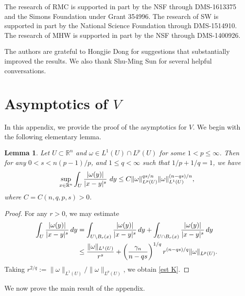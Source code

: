 \documentclass[11pt,reqno]{amsart}
\newcommand{\R}{\mathbb{R}}
\theoremstyle{plain}
\newtheorem{lemma}[theorem]{Lemma}
\theoremstyle{remark}
\numberwithin{equation}{section}
\begin{document}
The research of RMC is supported in part by the NSF through DMS-1613375 and the Simons Foundation under Grant 354996.  The research of SW is supported in part by the National Science Foundation through DMS-1514910.  The research of MHW is supported in part by the NSF through DMS-1400926.


The authors are grateful to Hongjie Dong for suggestions that substantially improved the results. We also thank Shu-Ming Sun for several helpful conversations.

\appendix
\section{Asymptotics of \texorpdfstring{$V$}{V}} \label{V appendix}

In this appendix, we provide the proof of the asymptotics for $V$.  We begin with the following elementary lemma.
\begin{lemma}\label{lem_velocity}
Let $U\subset \R^n$ and $\omega \in L^1(U) \cap L^p(U)$ for some $1< p \leq \infty$. Then for any $0<s < {n(p-1) / p}$, and $1 \leq q < \infty$ such that $1/p + 1/q = 1$, we have
\begin{equation}
  \label{est K}
  \sup_{x \in \mathbb{R}^n} \int_U {|\omega(y)| \over |x - y|^s} \ dy \leq C \|\omega\|_{L^p(U)}^{qs/n} \|\omega\|_{L^1(U)}^{(n-qs)/n},
\end{equation}
where $C = C(n,q,p,s) > 0$.
\end{lemma}
\begin{proof}
For any $r > 0$, we may estimate
\begin{align*}
\int_U {|\omega(y)| \over |x - y|^s} \, dy & = \int_{U \setminus B_r(x) } {|\omega(y)| \over |x - y|^s} \, dy + \int_{U\cap B_r(x)} {|\omega(y)| \over |x - y|^s} \, dy \\
& \leq {\|\omega\|_{L^1(U)} \over r^s} + \left( {\gamma_n \over n-qs} \right)^{1/q} r^{(n - qs)/q} \|\omega\|_{L^p(U)}. 
\end{align*}
Taking $r^{2/q} := \|\omega\|_{L^1(U)} / \|\omega\|_{L^p(U)}$, we obtain \eqref{est K}.
\end{proof}

We now prove the main result of the appendix.
\end{document}
